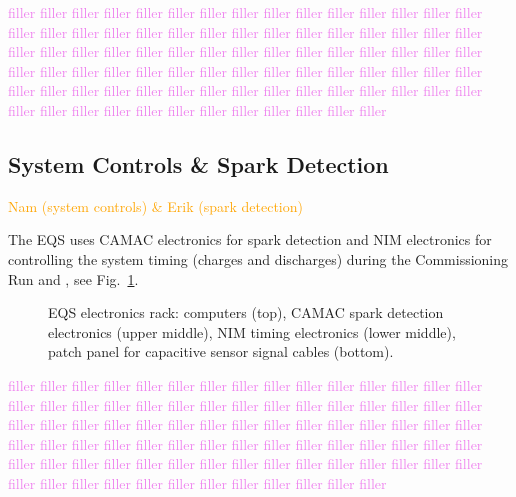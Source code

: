 \textcolor{violet}{filler filler filler filler filler filler filler filler filler filler filler filler filler filler filler filler filler filler filler filler filler filler filler filler filler filler filler filler filler filler filler filler filler filler filler filler filler filler filler filler filler filler filler filler filler filler filler filler filler filler filler filler filler filler filler filler filler filler filler filler filler filler filler filler filler filler filler filler filler filler filler filler filler filler filler filler filler filler filler filler filler filler filler filler filler filler filler}

\subsection{\label{sec:sparkctrls} System Controls \& Spark Detection}
\textcolor{orange}{Nam (system controls) \& Erik (spark detection)}
\medskip

The EQS uses CAMAC electronics for spark detection and NIM electronics for controlling the system timing (charges and discharges) during the Commissioning Run and \runone, see Fig.~\ref{fig:quad_rack}.
\begin{figure}[]
	\centering
	\caption{EQS electronics rack: computers (top), CAMAC spark detection electronics (upper middle), NIM timing electronics (lower middle), patch panel for capacitive sensor signal cables (bottom).}\label{fig:quad_rack}
\end{figure}

\textcolor{violet}{filler filler filler filler filler filler filler filler filler filler filler filler filler filler filler filler filler filler filler filler filler filler filler filler filler filler filler filler filler filler filler filler filler filler filler filler filler filler filler filler filler filler filler filler filler filler filler filler filler filler filler filler filler filler filler filler filler filler filler filler filler filler filler filler filler filler filler filler filler filler filler filler filler filler filler filler filler filler filler filler filler filler filler filler filler filler filler}

